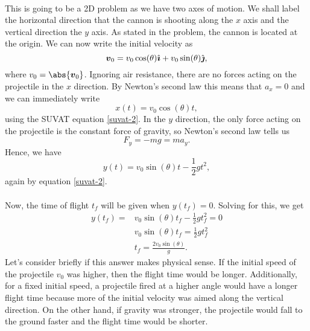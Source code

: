 \documentclass[../classical_mechanics.tex]{subfiles}
\begin{document}
        \paragraph{}
        This is going to be a 2D problem as we have two axes of motion.
        We shall label the horizontal direction that the cannon is shooting along the $x$ axis and the vertical direction the $y$ axis.
        As stated in the problem, the cannon is located at the origin.
        We can now write the initial velocity as
        \begin{equation}
            \boldsymbol{v}_0 = v_0\cos(\theta)\hat{\boldsymbol{\imath}} + v_0\sin(\theta)\hat{\boldsymbol{\jmath}},
        \end{equation}
        where $v_0=\abs{\vec{v}_0}$.
        Ignoring air resistance, there are no forces acting on the projectile in the $x$ direction.
        By Newton's second law this means that $a_x=0$ and we can immediately write
        \begin{equation}
            x(t) = v_0\cos(\theta)t,
        \end{equation}
        using the SUVAT equation \ref{suvat-2}.
        In the $y$ direction, the only force acting on the projectile is the constant force of gravity, so Newton's second law tells us
        \begin{equation}
            F_y = -mg = ma_y.
        \end{equation}
        Hence, we have
        \begin{equation}
            y(t) = v_0\sin(\theta)t - \frac{1}{2}gt^2,
        \end{equation}
        again by equation \ref{suvat-2}.

        \paragraph{}
        Now, the time of flight $t_f$ will be given when $y(t_f)=0$.
        Solving for this, we get
        \begin{align}
            y(t_f) = &v_0\sin(\theta)t_f - \frac{1}{2}gt_f^2 = 0\\
            &v_0\sin(\theta)t_f = \frac{1}{2}gt_f^2\\
            &t_f = \frac{2v_0\sin(\theta)}{g}.
        \end{align}
        Let's consider briefly if this answer makes physical sense.
        If the initial speed of the projectile $v_0$ was higher, then the flight time would be longer.
        Additionally, for a fixed initial speed, a projectile fired at a higher angle would have a longer flight time because more of the initial velocity was aimed along the vertical direction.
        On the other hand, if gravity was stronger, the projectile would fall to the ground faster and the flight time would be shorter.
\end{document}
